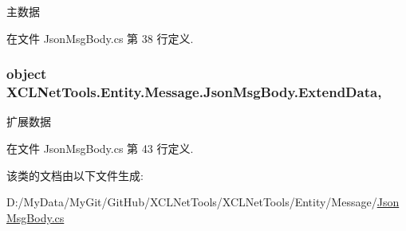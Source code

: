 主数据 



在文件 Json\-Msg\-Body.\-cs 第 38 行定义.

\hypertarget{class_x_c_l_net_tools_1_1_entity_1_1_message_1_1_json_msg_body_a0382629d68979ea8a39383a1d9891ab7}{
\subsubsection[{Extend\-Data}]{\setlength{\rightskip}{0pt plus 5cm}object X\-C\-L\-Net\-Tools.\-Entity.\-Message.\-Json\-Msg\-Body.\-Extend\-Data\hspace{0.3cm}{\ttfamily [get]}, {\ttfamily [set]}}}\label{class_x_c_l_net_tools_1_1_entity_1_1_message_1_1_json_msg_body_a0382629d68979ea8a39383a1d9891ab7}


扩展数据 



在文件 Json\-Msg\-Body.\-cs 第 43 行定义.



该类的文档由以下文件生成\-:\begin{DoxyCompactItemize}
\item 
D\-:/\-My\-Data/\-My\-Git/\-Git\-Hub/\-X\-C\-L\-Net\-Tools/\-X\-C\-L\-Net\-Tools/\-Entity/\-Message/\hyperlink{_json_msg_body_8cs}{Json\-Msg\-Body.\-cs}\end{DoxyCompactItemize}
